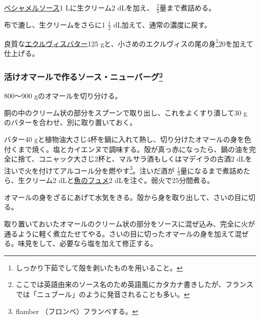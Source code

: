 \begin{recette}
\protect\hyperlink{sauce-bechamel}{ベシャメルソース}1 Lに生クリーム2
dLを加え、 \(\frac{2}{3}\)量まで煮詰める。

布で漉し、生クリームをさらに1 \(\frac{1}{2}\)
dL加えて、通常の濃度に戻す。

良質な\protect\hyperlink{beurre-d-ecrevisse}{エクルヴィスバター}125
gと、小さめのエクルヴィスの尾の身\footnote{しっかり下茹でして殻を剥いたものを用いること。}20を加えて仕上げる。

\hypertarget{sauce-new-burg-avec-le-homard-cru}{%
\subsubsection[活けオマールで作るソース・ニューバーグ]{\texorpdfstring{活けオマールで作るソース・ニューバーグ\footnote{ここでは英語由来のソース名のため英語風にカタカナ書きしたが、フランスでは「ニュブール」のように発音されることも多い。}}{活けオマールで作るソース・ニューバーグ}}\label{sauce-new-burg-avec-le-homard-cru}}



800〜900 gのオマールを切り分ける。

胴の中のクリーム状の部分をスプーンで取り出し、これをよくすり潰して30 g
のバターを合わせ、別に取り置いておく。

バター40
gと植物油大さじ4杯を鍋に入れて熱し、切り分けたオマールの身を色付くまで焼く。塩とカイエンヌで調味する。殻が真っ赤になったら、鍋の油を完全に捨て、コニャック大さじ2杯と、マルサラ酒もしくはマデイラの古酒2
dLを注いで火を付けてアルコール分を燃やす\footnote{flamber
  （フロンベ）フランベする。}。注いだ酒が
\(\frac{1}{3}\)量になるまで煮詰めたら、生クリーム2
dLと\protect\hyperlink{fumet-de-poisson}{魚のフュメ}2
dLを注ぐ。弱火で25分間煮る。

オマールの身をざるにあげて水気をきる。殻から身を取り出して、さいの目に切る。

取り置いておいたオマールのクリーム状の部分をソースに混ぜ込み、完全に火が通るように軽く煮立たせてやる。さいの目に切ったオマールの身を加えて混ぜる。味見をして、必要なら塩を加えて修正する。


\end{recette}
